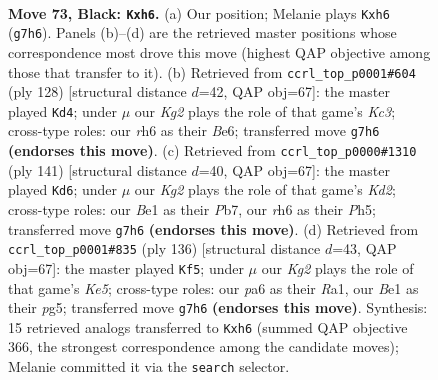 \documentclass[11pt]{article}
\begin{document}
\clearpage

\begin{figure}[p]\centering
\begin{subfigure}{0.46\textwidth}\centering
\resizebox{\linewidth}{!}{%
\newchessgame
\chessboard[
  setfen={8/p3R1k1/P6R/1P3p2/b4P2/8/3r4/4b1K1 b - - 0 73},
  showmover=false,
  pgfstyle=straightmove, color=movearrow, markmove={g7-h6}
]}
\caption{}
\end{subfigure}\hfill
\begin{subfigure}{0.46\textwidth}\centering
\resizebox{\linewidth}{!}{%
\newchessgame
\chessboard[
  setfen={R7/6k1/3pBp2/3P4/5P2/2K1r1P1/8/8 w - - 9 65},
  showmover=false,
  pgfstyle=straightmove, color=movearrow, markmove={c3-d4}
]}
\caption{}
\end{subfigure}
\\[4pt]
\begin{subfigure}{0.46\textwidth}\centering
\resizebox{\linewidth}{!}{%
\newchessgame
\chessboard[
  setfen={8/1p1k1R2/p7/P4p1p/1PK2P2/5r2/8/8 b - - 3 71},
  showmover=false,
  pgfstyle=straightmove, color=movearrow, markmove={d7-d6}
]}
\caption{}
\end{subfigure}\hfill
\begin{subfigure}{0.46\textwidth}\centering
\resizebox{\linewidth}{!}{%
\newchessgame
\chessboard[
  setfen={8/3r1k2/2R5/4K1pP/2p5/2P1r3/8/R7 w - - 6 69},
  showmover=false,
  pgfstyle=straightmove, color=movearrow, markmove={e5-f5}
]}
\caption{}
\end{subfigure}
\caption{\textbf{Move 73, Black: \texttt{Kxh6}.} (a) Our position; Melanie plays \texttt{Kxh6} (\texttt{g7h6}). Panels (b)--(d) are the retrieved master positions whose correspondence most drove this move (highest QAP objective among those that transfer to it). (b) Retrieved from \texttt{ccrl\_top\_p0001\#604} (ply 128) [structural distance $d$=42, QAP obj=67]: the master played \texttt{Kd4}; under $\mu$ our \emph{Kg2} plays the role of that game's \emph{Kc3}; cross-type roles: our \emph{r}h6 as their \emph{B}e6; transferred move \texttt{g7h6} \textbf{(endorses this move)}. (c) Retrieved from \texttt{ccrl\_top\_p0000\#1310} (ply 141) [structural distance $d$=40, QAP obj=67]: the master played \texttt{Kd6}; under $\mu$ our \emph{Kg2} plays the role of that game's \emph{Kd2}; cross-type roles: our \emph{B}e1 as their \emph{P}b7, our \emph{r}h6 as their \emph{P}h5; transferred move \texttt{g7h6} \textbf{(endorses this move)}. (d) Retrieved from \texttt{ccrl\_top\_p0001\#835} (ply 136) [structural distance $d$=43, QAP obj=67]: the master played \texttt{Kf5}; under $\mu$ our \emph{Kg2} plays the role of that game's \emph{Ke5}; cross-type roles: our \emph{p}a6 as their \emph{R}a1, our \emph{B}e1 as their \emph{p}g5; transferred move \texttt{g7h6} \textbf{(endorses this move)}. Synthesis: 15 retrieved analogs transferred to \texttt{Kxh6} (summed QAP objective 366, the strongest correspondence among the candidate moves); Melanie committed it via the \texttt{search} selector.}
\label{fig:thought-m145}
\end{figure}
\end{document}
